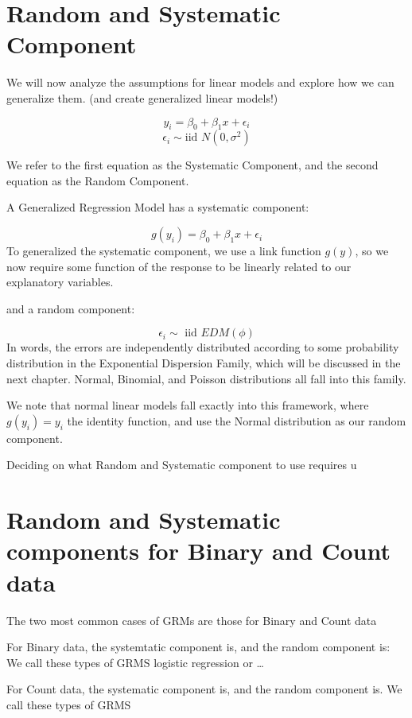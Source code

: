 \documentclass[
]{book}
\begin{document}
\hypertarget{random-and-systematic-component}{%
\section{Random and Systematic Component}\label{random-and-systematic-component}}

We will now analyze the assumptions for linear models and explore how we can generalize them. (and create generalized linear models!)

\[y_i  = \beta_0 + \beta_1 x + \epsilon_i \]
\[ \epsilon_i \sim \text{iid } N(0,\sigma^2)\]

We refer to the first equation as the Systematic Component, and the second equation as the Random Component.

A Generalized Regression Model has a systematic component:

\[ g(y_i) = \beta_0 + \beta_1 x + \epsilon_i\]
To generalized the systematic component, we use a link function \(g(y)\), so we now require some function of the response to be linearly related to our explanatory variables.

and a random component:

\[ \epsilon_i \sim \text{ iid } EDM(\phi) \]
In words, the errors are independently distributed according to some probability distribution in the Exponential Dispersion Family, which will be discussed in the next chapter. Normal, Binomial, and Poisson distributions all fall into this family.

We note that normal linear models fall exactly into this framework, where \(g(y_i) = y_i\) the identity function, and use the Normal distribution as our random component.

Deciding on what Random and Systematic component to use requires u

\hypertarget{random-and-systematic-components-for-binary-and-count-data}{%
\section{Random and Systematic components for Binary and Count data}\label{random-and-systematic-components-for-binary-and-count-data}}

The two most common cases of GRMs are those for Binary and Count data

For Binary data, the systemtatic component is, and the random component is: We call these types of GRMS logistic regression or \ldots{}

For Count data, the systematic component is, and the random component is. We call these types of GRMS
\end{document}
